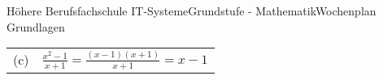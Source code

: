 \documentclass[oneside,openany,headings=optiontotoc,11pt,numbers=noenddot]{scrreprt}
\begin{document}
\begin{worksheet}{Höhere Berufsfachschule IT-Systeme}{Grundstufe - Mathematik}{Wochenplan Grundlagen}
\begin{framed}
\begin{tabularx}{\textwidth}{lX}
				(c) & \(\frac{x^2-1}{x+1} = \frac{(x-1)(x+1)}{x+1} = x-1\)
			\end{tabularx}
		\end{framed}
	\end{worksheet}
\end{document}
